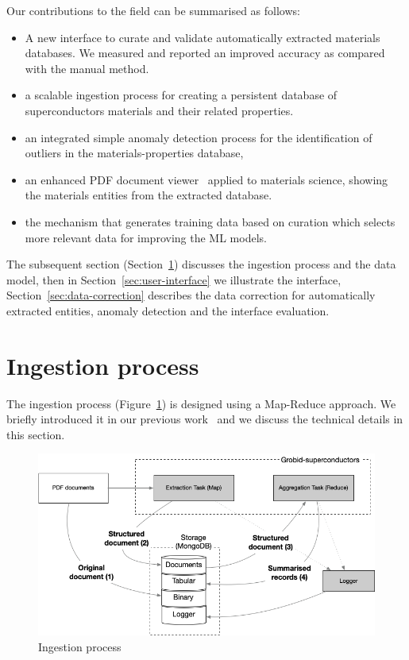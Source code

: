 \documentclass[a4paper]{article}
\begin{document}
Our contributions to the field can be summarised as follows:
\begin{itemize}
    \item A new interface to curate and validate automatically extracted materials databases. We measured and reported an improved accuracy as compared with the manual method.
    \item a scalable ingestion process for creating a persistent database of superconductors materials and their related properties.
    \item an integrated simple anomaly detection process for the identification of outliers in the materials-properties database, 
    \item an enhanced PDF document viewer~\cite{wang2022hammer} applied to materials science, showing the materials entities from the extracted database. 
    \item the mechanism that generates training data based on curation which selects more relevant data for improving the ML models.
\end{itemize}

The subsequent section (Section~\ref{sec:ingestion}) discusses the ingestion process and the data model, then in Section~\ref{sec:user-interface} we illustrate the interface, Section~\ref{sec:data-correction} describes the data correction for automatically extracted entities, anomaly detection and the interface evaluation. 


\section{Ingestion process}
\label{sec:ingestion}

The ingestion process (Figure~\ref{fig:map-reduce}) is designed using a Map-Reduce approach. 
We briefly introduced it in our previous work~\cite{lfoppiano2023automatic} and we discuss the technical details in this section. 

\begin{figure}[ht]
  \centering
  \includegraphics[width=\textwidth]{images/ingestion-schema.png} 
  \caption{Ingestion process}
  \label{fig:map-reduce}
\end{figure}
\end{document}
